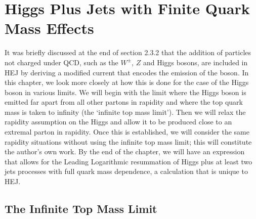\chapter{Higgs Plus Jets with Finite Quark Mass Effects}


It was briefly discussed at the end of section 2.3.2 that the addition of particles not charged under QCD, such as the $W^\pm$, $Z$ and Higgs bosons, are included in HEJ by deriving a modified current that encodes the emission of the boson. In this chapter, we look more closely at how this is done for the case of the Higgs boson in various limits. We will begin with the limit where the Higgs boson is emitted far apart from all other partons in rapidity and where the top quark mass is taken to infinity (the `infinite top mass limit'). Then we will relax the rapidity assumption on the Higgs and allow it to be produced close to an extremal parton in rapidity. Once this is established, we will consider the same rapidity situations without using the infinite top mass limit; this will constitute the author's own work. By the end of the chapter, we will have an expression that allows for the Leading Logarithmic resummation of Higgs plus at least two jets processes with full quark mass dependence, a calculation that is unique to HEJ.   
\section{The Infinite Top Mass Limit}

